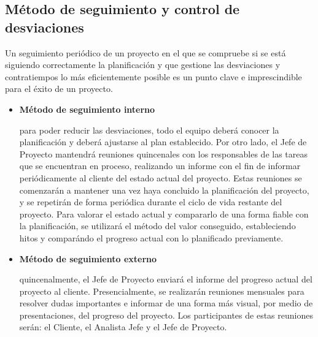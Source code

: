 \subsection{Método de seguimiento y control de desviaciones}
\par Un seguimiento periódico de un proyecto en el que se compruebe si se está siguiendo correctamente la planificación y que gestione las desviaciones y contratiempos lo más eficientemente posible es un punto clave e imprescindible para el éxito de un proyecto.
\begin{itemize}[-]

\item \textbf{Método de seguimiento interno}
\par para poder reducir las desviaciones, todo el equipo deberá conocer la planificación y deberá ajustarse al plan establecido. Por otro lado, el Jefe de Proyecto mantendrá reuniones quincenales con los responsables de las tareas que se encuentran en proceso, realizando un informe con el fin de informar periódicamente al cliente del estado actual del proyecto. Estas reuniones se comenzarán a mantener una vez haya concluido la planificación del proyecto, y se repetirán de forma periódica durante el ciclo de vida restante del proyecto. Para valorar el estado actual y compararlo de una forma fiable con la planificación, se utilizará el método del valor conseguido, estableciendo hitos y comparándo el progreso actual con lo planificado previamente.
\item \textbf{Método de seguimiento externo}
\par quincenalmente, el Jefe de Proyecto enviará el informe del progreso actual del proyecto al cliente. Presencialmente, se realizarán reuniones mensuales para resolver dudas importantes e informar de una forma más visual, por medio de presentaciones, del progreso del proyecto. Los participantes de estas reuniones serán: el Cliente, el Analista Jefe y el Jefe de Proyecto.
\end{itemize}
